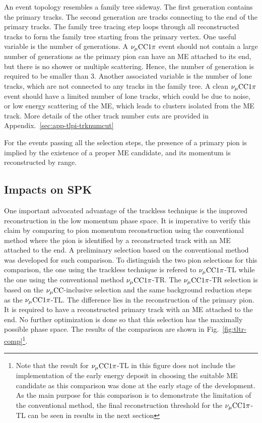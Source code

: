             An event topology resembles a family tree sideway. 
            The first generation contains the primary tracks.
            The second generation are tracks connecting to the end of the primary tracks.
            The family tree tracing step loops through all reconstructed tracks to form the family tree starting from the primary vertex.
            One useful variable is the number of generations.
            A $\nu_{\mu}\textrm{CC}1\pi$ event should not contain a large number of generations as the primary pion can have an ME attached to its end, but there is no shower or multiple scattering.
            Hence, the number of generation is required to be smaller than $3$.
            Another associated variable is the number of lone tracks, which are not connected to any tracks in the family tree. 
            A clean $\nu_{\mu}\textrm{CC}1\pi$ event should have a limited number of lone tracks, which could be due to noise, or low energy scattering of the ME, which leads to clusters isolated from the ME track. 
            More details of the other track number cuts are provided in Appendix.~\ref{sec:app-tlpi-trknumcut}
        
            For the events passing all the selection steps, the presence of a primary pion is implied by the existence of a proper ME candidate, and its momentum is reconstructed by range. 

     \subsection{Impacts on SPK}
          One important advocated advantage of the trackless technique is the improved reconstruction in the low momentum phase space.
          It is imperative to verify this claim by comparing to pion momentum reconstruction using the conventional method where the pion is identified by a reconstructed track with an ME attached to the end.
          A preliminary selection based on the conventional method was developed for such comparison.
          To distinguish the two pion selections for this comparison, the one using the trackless technique is refered to $\nu_{\mu}\textrm{CC}1\pi$-TL while the one using the conventional method $\nu_{\mu}\textrm{CC}1\pi$-TR.
          The $\nu_{\mu}\textrm{CC}1\pi$-TR selection is based on the $\nu_{\mu}\textrm{CC}$-inclusive selection and the same background reduction steps as the $\nu_{\mu}\textrm{CC}1\pi$-TL.
          The difference lies in the reconstruction of the primary pion.
          It is required to have a reconstructed primary track with an ME attached to the end.
          No further optimization is done so that this selection has the maximally possible phase space.
          The results of the comparison are shown in Fig.~\ref{fig:tltr-comp}\footnote{Note that the result for $\nu_{\mu}\textrm{CC}1\pi$-TL in this figure does not include the implementation of the early energy deposit in choosing the suitable ME candidate as this comparison was done at the early stage of the development.
          As the main purpose for this comparison is to demonstrate the limitation of the conventional method, the final reconstruction threshold for the $\nu_{\mu}\textrm{CC}1\pi$-TL can be seen in results in the next section}.

